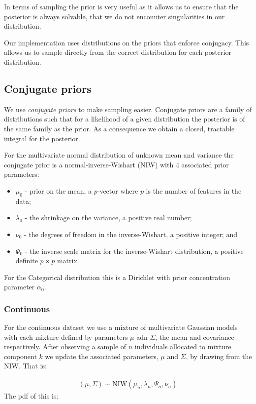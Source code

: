 \documentclass[11pt]{article} %
\begin{document}
In terms of sampling the prior is very useful as it allows us to ensure that the posterior is always solvable, that we do not encounter singularities in our distribution.

Our implementation uses distributions on the priors that enforce conjugacy. This allows us to sample directly from the correct distribution for each posterior distribution.

\subsection{Conjugate priors}
We use \emph{conjugate priors} to make sampling easier. Conjugate priors are a family of distributions such that for a likelihood of a given distribution the posterior is of the same family as the prior. As a consequence we obtain a closed, tractable integral for the posterior.

 For the multivariate normal distribution of unknown mean and variance the conjugate prior is a normal-inverse-Wishart (NIW) with 4 associated prior parameters:
\begin{itemize}
 \item $\mu_0$ - prior on the mean, a $p$-vector where $p$ is the number of features in the data;
 \item $\lambda_0$ - the shrinkage on the variance, a positive real number;
 \item $\nu_0$ - the degrees of freedom in the inverse-Wishart, a positive integer; and 
 \item $\Psi_0$ - the inverse scale matrix for the inverse-Wishart distribution, a positive definite $p \times p$ matrix.
\end{itemize}
For the Categorical distribution this is a Dirichlet with prior concentration parameter $\alpha_0$.

\subsubsection{Continuous}
For the continuous dataset we use a mixture of multivariate Gaussian models with each mixture defined by parameters $\mu$ adn $\Sigma$, the mean and covariance respectively. After observing a sample of $n$ individuals allocated to mixture component $k$ we update the associated parameters, $\mu$ and $\Sigma$, by drawing from the NIW. That is:

\begin{align}
(\mu, \Sigma) \sim \text{NIW}(\mu_n, \lambda_n, \Psi_n, \nu_n)
\end{align}
The pdf of this is:
\end{document}
